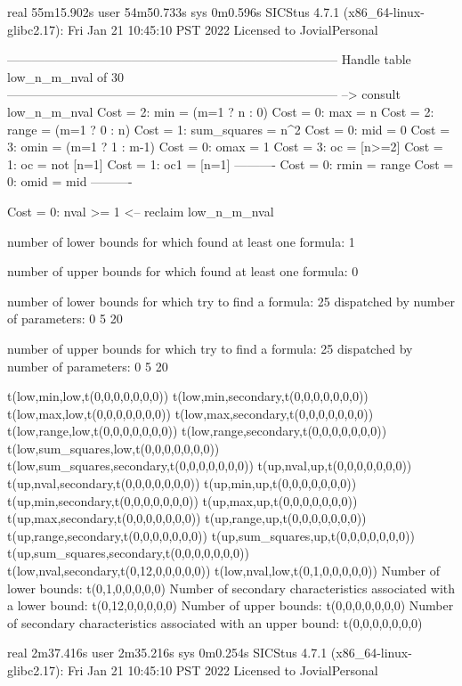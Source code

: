 real	55m15.902s
user	54m50.733s
sys	0m0.596s
SICStus 4.7.1 (x86_64-linux-glibc2.17): Fri Jan 21 10:45:10 PST 2022
Licensed to JovialPersonal


--------------------------------------------------------------------------------
Handle table low_n_m_nval of 30
--------------------------------------------------------------------------------
--> consult low_n_m_nval
Cost =  2:  min         = (m=1 ? n : 0)
Cost =  0:  max         = n
Cost =  2:  range       = (m=1 ? 0 : n)
Cost =  1:  sum_squares = n^2
Cost =  0:  mid         = 0
Cost =  3:  omin        = (m=1 ? 1 : m-1)
Cost =  0:  omax        = 1
Cost =  3:  oc          = [n>=2]
Cost =  1:  oc          = not [n=1]
Cost =  1:  oc1         = [n=1]
----------
Cost =  0:  rmin        = range
Cost =  0:  omid        = mid
----------

Cost =  0:  nval >= 1
<-- reclaim low_n_m_nval

number of lower bounds for which found at least one formula: 1

number of upper bounds for which found at least one formula: 0

number of lower bounds for which try to find a formula: 25
dispatched by number of parameters: 0  5  20

number of upper bounds for which try to find a formula: 25
dispatched by number of parameters: 0  5  20

t(low,min,low,t(0,0,0,0,0,0,0))
t(low,min,secondary,t(0,0,0,0,0,0,0))
t(low,max,low,t(0,0,0,0,0,0,0))
t(low,max,secondary,t(0,0,0,0,0,0,0))
t(low,range,low,t(0,0,0,0,0,0,0))
t(low,range,secondary,t(0,0,0,0,0,0,0))
t(low,sum_squares,low,t(0,0,0,0,0,0,0))
t(low,sum_squares,secondary,t(0,0,0,0,0,0,0))
t(up,nval,up,t(0,0,0,0,0,0,0))
t(up,nval,secondary,t(0,0,0,0,0,0,0))
t(up,min,up,t(0,0,0,0,0,0,0))
t(up,min,secondary,t(0,0,0,0,0,0,0))
t(up,max,up,t(0,0,0,0,0,0,0))
t(up,max,secondary,t(0,0,0,0,0,0,0))
t(up,range,up,t(0,0,0,0,0,0,0))
t(up,range,secondary,t(0,0,0,0,0,0,0))
t(up,sum_squares,up,t(0,0,0,0,0,0,0))
t(up,sum_squares,secondary,t(0,0,0,0,0,0,0))
t(low,nval,secondary,t(0,12,0,0,0,0,0))
t(low,nval,low,t(0,1,0,0,0,0,0))
Number of lower bounds:                                             t(0,1,0,0,0,0,0)
Number of secondary characteristics associated with a lower bound:  t(0,12,0,0,0,0,0)
Number of upper bounds:                                             t(0,0,0,0,0,0,0)
Number of secondary characteristics associated with an upper bound: t(0,0,0,0,0,0,0)

real	2m37.416s
user	2m35.216s
sys	0m0.254s
SICStus 4.7.1 (x86_64-linux-glibc2.17): Fri Jan 21 10:45:10 PST 2022
Licensed to JovialPersonal


